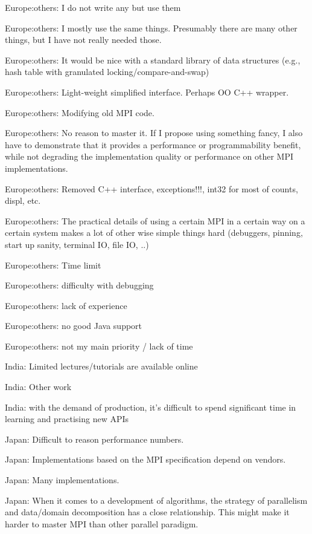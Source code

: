 \item Europe:others: I do not write any but use them
\item Europe:others: I mostly use the same things.  Presumably there are many other things, but I have not really needed those.
\item Europe:others: It would be nice with a standard library of data structures (e.g., hash table with granulated locking/compare-and-swap)
\item Europe:others: Light-weight simplified interface. Perhaps OO C++ wrapper.
\item Europe:others: Modifying old MPI code.
\item Europe:others: No reason to master it. If I propose using something fancy, I also have to demonstrate that it provides a performance or programmability benefit, while not degrading the implementation quality or performance on other MPI implementations.
\item Europe:others: Removed C++ interface, exceptions!!!, int32 for most of counts, displ, etc.
\item Europe:others: The practical details of using a certain MPI in a certain way on a certain system makes a lot of other wise simple things hard (debuggers, pinning, start up sanity, terminal IO, file IO, ..)
\item Europe:others: Time limit
\item Europe:others: difficulty with debugging
\item Europe:others: lack of experience
\item Europe:others: no good Java support
\item Europe:others: not my main priority / lack of time
\item India: Limited lectures/tutorials are available online
\item India: Other work
\item India: with the demand of production, it's difficult to spend significant time in learning and practising new APIs
\item Japan: Difficult to reason performance numbers.
\item Japan: Implementations based on the MPI specification depend on vendors.
\item Japan: Many implementations.
\item Japan: When it comes to a development of algorithms, the strategy of parallelism and  data/domain decomposition has a close relationship. This might make it harder to master MPI than other parallel paradigm.
